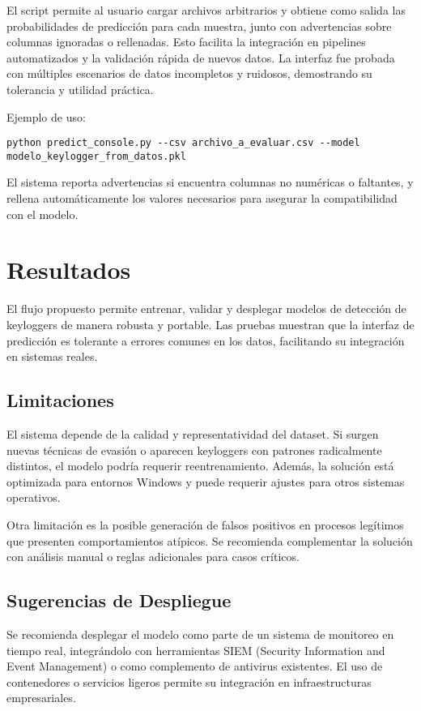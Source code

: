 \documentclass{article}
\begin{document}
El script permite al usuario cargar archivos arbitrarios y obtiene como salida las probabilidades de predicción para cada muestra, junto con advertencias sobre columnas ignoradas o rellenadas. Esto facilita la integración en pipelines automatizados y la validación rápida de nuevos datos. La interfaz fue probada con múltiples escenarios de datos incompletos y ruidosos, demostrando su tolerancia y utilidad práctica.

Ejemplo de uso:
\begin{verbatim}
python predict_console.py --csv archivo_a_evaluar.csv --model modelo_keylogger_from_datos.pkl
\end{verbatim}
El sistema reporta advertencias si encuentra columnas no numéricas o faltantes, y rellena automáticamente los valores necesarios para asegurar la compatibilidad con el modelo.

\section{Resultados}
El flujo propuesto permite entrenar, validar y desplegar modelos de detección de keyloggers de manera robusta y portable. Las pruebas muestran que la interfaz de predicción es tolerante a errores comunes en los datos, facilitando su integración en sistemas reales.

\subsection{Limitaciones}
El sistema depende de la calidad y representatividad del dataset. Si surgen nuevas técnicas de evasión o aparecen keyloggers con patrones radicalmente distintos, el modelo podría requerir reentrenamiento. Además, la solución está optimizada para entornos Windows y puede requerir ajustes para otros sistemas operativos.

Otra limitación es la posible generación de falsos positivos en procesos legítimos que presenten comportamientos atípicos. Se recomienda complementar la solución con análisis manual o reglas adicionales para casos críticos.

\subsection{Sugerencias de Despliegue}
Se recomienda desplegar el modelo como parte de un sistema de monitoreo en tiempo real, integrándolo con herramientas SIEM (Security Information and Event Management) o como complemento de antivirus existentes. El uso de contenedores o servicios ligeros permite su integración en infraestructuras empresariales.
\end{document}
